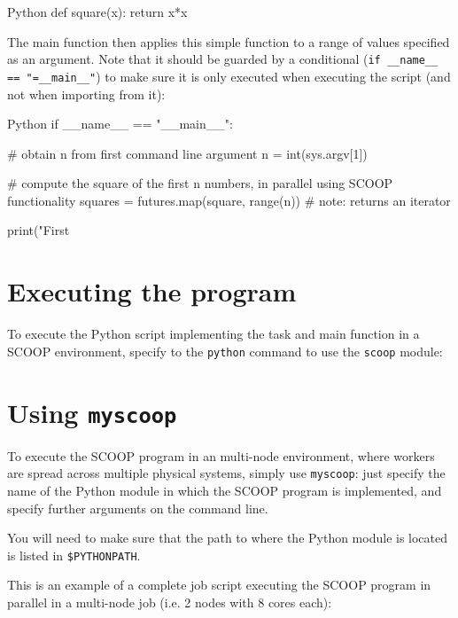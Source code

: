 \begin{code}{Python}
def square(x):
    return x*x
\end{code}

The main function then applies this simple function to a range of values specified as an argument.
Note that it should be guarded by a conditional (\lstinline|if __name__ == "=__main__"|) to make sure it is only executed
when executing the script (and not when importing from it):

\begin{code}{Python}
if __name__ == "__main__":

    # obtain n from first command line argument
    n = int(sys.argv[1])

    # compute the square of the first n numbers, in parallel using SCOOP functionality
    squares = futures.map(square, range(n))  # note: returns an iterator

    print("First %
\end{code}

\section{Executing the program}

To execute the Python script implementing the task and main function in a SCOOP environment,
specify to the \lstinline|python| command to use the \lstinline|scoop| module:

\begin{prompt}
\end{prompt}


\section{Using \texttt{myscoop}}

To execute the SCOOP program in an multi-node environment, where workers are spread
across multiple physical systems, simply use \lstinline|myscoop|: just specify the
name of the Python module in which the SCOOP program is implemented, and specify
further arguments on the command line.

You will need to make sure that the path to where the Python module is located is listed in \lstinline|$PYTHONPATH|.

This is an example of a complete job script executing the SCOOP program in parallel
in a multi-node job (i.e. 2 nodes with 8 cores each):

